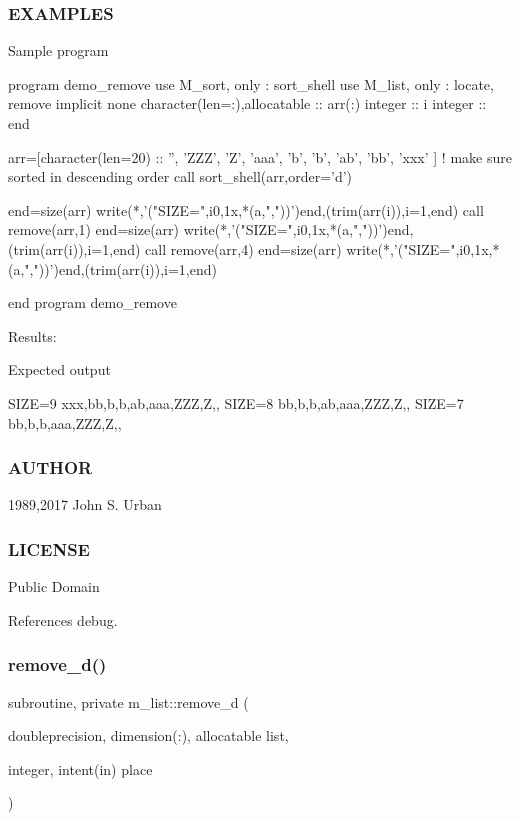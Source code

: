 \subsubsection*{E\+X\+A\+M\+P\+L\+ES}

\begin{DoxyVerb}Sample program

 program demo_remove
 use M_sort, only : sort_shell
 use M_list, only : locate, remove
 implicit none
 character(len=:),allocatable :: arr(:)
 integer                       :: i
 integer                       :: end

 arr=[character(len=20) :: '', 'ZZZ', 'Z', 'aaa', 'b', 'b', 'ab', 'bb', 'xxx' ]
 ! make sure sorted in descending order
 call sort_shell(arr,order='d')

 end=size(arr)
 write(*,'("SIZE=",i0,1x,*(a,","))')end,(trim(arr(i)),i=1,end)
 call remove(arr,1)
 end=size(arr)
 write(*,'("SIZE=",i0,1x,*(a,","))')end,(trim(arr(i)),i=1,end)
 call remove(arr,4)
 end=size(arr)
 write(*,'("SIZE=",i0,1x,*(a,","))')end,(trim(arr(i)),i=1,end)

 end program demo_remove
\end{DoxyVerb}


Results\+:

Expected output

S\+I\+ZE=9 xxx,bb,b,b,ab,aaa,Z\+ZZ,Z,, S\+I\+ZE=8 bb,b,b,ab,aaa,Z\+ZZ,Z,, S\+I\+ZE=7 bb,b,b,aaa,Z\+ZZ,Z,,

\subsubsection*{A\+U\+T\+H\+OR}

1989,2017 John S. Urban \subsubsection*{L\+I\+C\+E\+N\+SE}

Public Domain 

References debug.

\mbox{\label{namespacem__list_a6c5f971866302b40b5952ad919203461}} 
\subsubsection{\texorpdfstring{remove\+\_\+d()}{remove\_d()}}
{\footnotesize\ttfamily subroutine, private m\+\_\+list\+::remove\+\_\+d (\begin{DoxyParamCaption}\item[{doubleprecision, dimension(\+:), allocatable}]{list,  }\item[{integer, intent(in)}]{place }\end{DoxyParamCaption})\hspace{0.3cm}{\ttfamily [private]}}



